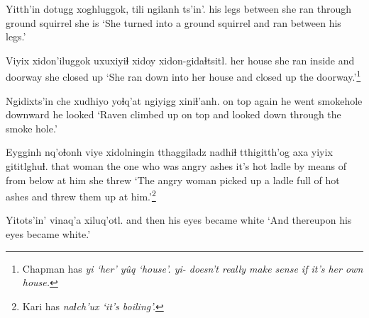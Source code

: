 \documentclass[12pt]{article}
\begin{document}
\gll Yitth'in dotugg xoghluggok, tili   ngilanh ts'in'.
{his legs} between {she ran through} {ground squirrel} {she is} {}
\glt `She turned into a ground squirrel and ran between his legs.'
\glend

\gll Viyix xidon'iluggok  uxuxiyiɬ xidoy xidon-gidaɬtsitl.
{her house} {she ran inside}  and  doorway {she closed up}
\glt `She ran down into her house and closed up the doorway.'\footnote{Chapman has \em yi \em `her' \em y\^uq \em `house'. \em yi- \em doesn't really make sense if it's her own house.}
\glend

\gll Ngidixts'in che xudhiyo yoɬq'at ngiyigg xiniɬ'anh.
{on top}  again {he went} smokehole downward {he looked}
\glt `Raven climbed up on top and looked down through the smoke hole.'
\glend

\gll Eygginh nq'oɬonh {viye xidolningin} tthaggiladz nadhiɬ tthigitth'og axa yiyix  gititlghuɬ.
that  woman  {the one who was angry} ashes {it's hot} ladle {by means of} {from below at him} {she threw}
\glt `The angry woman picked up a ladle full of hot ashes and threw them up at him.'\footnote{Kari has \em naɬch'ux \em `it's boiling'.}
\glend

\gll Yitots'in' vinaq'a xiluq'otl.
{and then} {his eyes} {became white}
\glt `And thereupon his eyes became white.'
\glend
\end{document}
